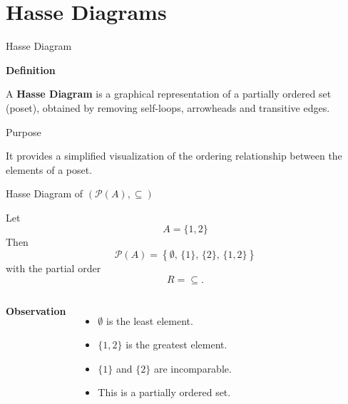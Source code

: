 \section{Hasse Diagrams}

\begin{frame}{Hasse Diagram}

\textbf{Definition}

A \textbf{Hasse Diagram} is a graphical representation of a partially
ordered set (poset), obtained by removing self-loops, arrowheads and
transitive edges.

\vspace{0.8cm}

\begin{block}{Purpose}

\vspace{0.1cm}
 It provides a simplified visualization of the ordering relationship between the elements of a poset.
\end{block}

\end{frame}


\begin{frame}{Hasse Diagram of $\left(\mathcal P(A),\subseteq\right)$}

Let
\[
A=\{1,2\}
\]
Then
\[
\mathcal P(A)=
\left\{
\emptyset,\,
\{1\},\,
\{2\},\,
\{1,2\}
\right\}
\]
with the partial order
\[
R=\subseteq .
\]

\begin{columns}


\centering



\textbf{Observation}

\begin{itemize}
\item $\emptyset$ is the least element.
\item $\{1,2\}$ is the greatest element.
\item $\{1\}$ and $\{2\}$ are incomparable.
\item This is a partially ordered set.
\end{itemize}

\end{columns}

\end{frame}

